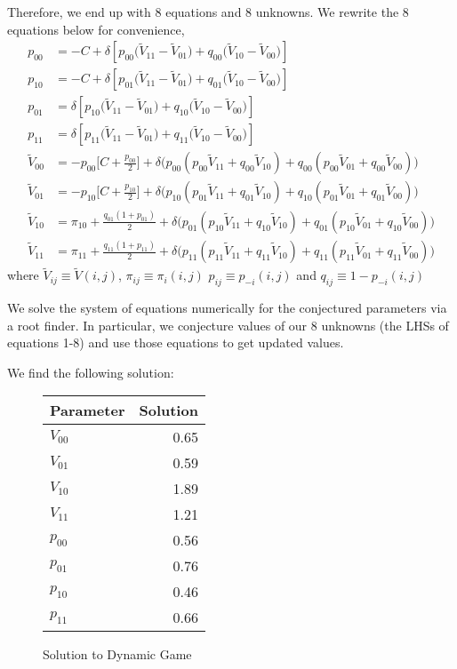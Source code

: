 \documentclass{article}
\begin{document}
\begin{enumerate}
\begin{answer}
Therefore, we end up with 8 equations and 8 unknowns. We rewrite the 8 equations below for convenience,
\begin{align}
    p_{00} &= -C + \delta \left[p_{00}\Bigr(\tilde{V}_{11}-\tilde{V}_{01}\Bigr) + q_{00}\Bigr(\tilde{V}_{10}-\tilde{V}_{00}\Bigr)\right] \\
    p_{10} &= -C + \delta \left[p_{01}\Bigr(\tilde{V}_{11}-\tilde{V}_{01}\Bigr) + q_{01}\Bigr(\tilde{V}_{10}-\tilde{V}_{00}\Bigr)\right] \\
    p_{01} &= \delta \left[p_{10}\Bigr(\tilde{V}_{11}-\tilde{V}_{01}\Bigr) + q_{10}\Bigr(\tilde{V}_{10}-\tilde{V}_{00}\Bigr)\right] \\
    p_{11} &= \delta \left[p_{11}\Bigr(\tilde{V}_{11}-\tilde{V}_{01}\Bigr) + q_{11}\Bigr(\tilde{V}_{10}-\tilde{V}_{00}\Bigr)\right] \\
    \tilde{V}_{00} &= -p_{00}\Bigr[C + \frac{p_{00}}{2} \Bigr] + \delta\Bigr(p_{00}(p_{00}\tilde{V}_{11} + q_{00}\tilde{V}_{10}) + q_{00}(p_{00}\tilde{V}_{01} + q_{00}\tilde{V}_{00})\Bigr) \\
    \tilde{V}_{01} &= -p_{10}\Bigr[C + \frac{p_{10}}{2} \Bigr] + \delta\Bigr(p_{10}(p_{01}\tilde{V}_{11} + q_{01}\tilde{V}_{10}) + q_{10}(p_{01}\tilde{V}_{01} + q_{01}\tilde{V}_{00})\Bigr) \\
    \tilde{V}_{10} &=\pi_{10} + \frac{q_{01}(1+p_{01})}{2}   + \delta\Bigr(p_{01}(p_{10}\tilde{V}_{11} + q_{10}\tilde{V}_{10}) + q_{01}(p_{10}\tilde{V}_{01} + q_{10}\tilde{V}_{00}) \Bigr) \\
    \tilde{V}_{11}&=\pi_{11} + \frac{q_{11}(1+p_{11})}{2}  + \delta\Bigr(p_{11}(p_{11}\tilde{V}_{11} + q_{11}\tilde{V}_{10})+q_{11}(p_{11}\tilde{V}_{01} + q_{11}\tilde{V}_{00})\Bigr)
\end{align}
where $\tilde{V}_{ij}\equiv\tilde{V}(i,j)$, $\pi_{ij}\equiv\pi_{i}(i,j)$ $p_{ij}\equiv p_{-i}(i,j)$ and $q_{ij}\equiv 1-p_{-i}(i,j)$


We solve the system of equations numerically for the conjectured parameters via a root finder. In particular, we conjecture values of our 8 unknowns (the LHSs of equations 1-8) and use those equations to get updated values.

We find the following solution:
\begin{figure}[h]
\centering
\caption{Solution to Dynamic Game}
\begin{tabular}{l|r}  
Parameter & Solution \\ \hline
$V_{00}$ & 0.65 \\
$V_{01}$ & 0.59 \\
$V_{10}$ & 1.89 \\
$V_{11}$ & 1.21 \\
$p_{00}$ & 0.56 \\
$p_{01}$ & 0.76 \\
$p_{10}$ & 0.46 \\
$p_{11}$ & 0.66 \\
 \end{tabular}
\end{figure}


\end{answer}
\end{enumerate}
\end{document}
